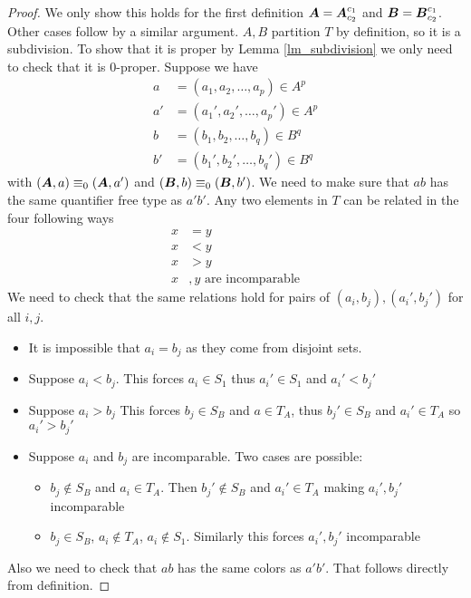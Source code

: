 \documentclass{amsart}
\DeclareMathOperator{\A}{\boldface A}
\DeclareMathOperator{\B}{\boldface B}
\begin{document}
\begin{proof}
	We only show this holds for the first definition $\A = \A^{c_1}_{c_2}$ and $\B = \B^{c_1}_{c_2}$. Other cases follow by a similar argument. $A,B$ partition $T$ by definition, so it is a subdivision. To show that it is proper by Lemma \ref{lm_subdivision} we only need to check that it is $0$-proper. Suppose we have 
	\begin{align*}
		a &= (a_1, a_2, \ldots, a_p) \in A^p \\
		a' &= (a_1', a_2', \ldots, a_p') \in A^p  \\
		b &= (b_1, b_2, \ldots, b_q) \in B^q  \\
		b' &= (b_1', b_2', \ldots, b_q') \in B^q 
	\end{align*}
	with $(\A, a) \equiv_0 (\A, a')$ and $(\B, b) \equiv_0 (\B, b')$. We need to make sure that $ab$ has the same quantifier free type as $a'b'$. Any two elements in $T$ can be related in the four following ways
	\begin{align*}
		x &= y \\
		x &< y \\
		x &> y \\
		x&,y \text{ are incomparable}
	\end{align*}
	We need to check that the same relations hold for pairs of $(a_i, b_j), (a_i', b_j')$ for all $i,j$.
	
	\begin{itemize}
		\item It is impossible that $a_i = b_j$ as they come from disjoint sets.
		\item Suppose $a_i < b_j$. This forces $a_i \in S_1$ thus $a_i' \in S_1$ and $a_i' < b_j'$ 
		\item Suppose $a_i > b_j$ This forces $b_j \in S_B$ and $a \in T_A$, thus $b_j' \in S_B$ and $a_i' \in T_A$ so $a_i' > b_j'$ 
		\item Suppose $a_i$ and $b_j$ are incomparable. Two cases are possible:
		\begin{itemize}
			\item $b_j \notin S_B$ and $a_i \in T_A$. Then $b_j' \notin S_B$ and $a_i' \in T_A$ making $a_i', b_j'$ incomparable
			\item $b_j \in S_B$, $a_i \notin T_A$, $a_i \notin S_1$. Similarly this forces $a_i', b_j'$ incomparable
		\end{itemize}
	\end{itemize}
	Also we need to check that $ab$ has the same colors as $a'b'$. That follows directly from definition.
\end{proof}
\end{document}
